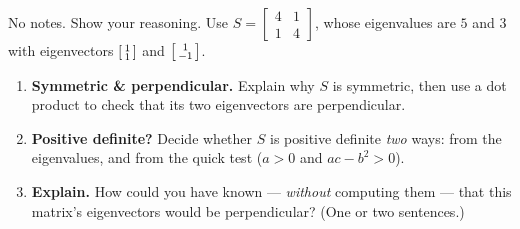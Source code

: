 \documentclass[10pt]{article}
\begin{document}
\namedateperiod

\vspace{0.15in}

No notes. Show your reasoning. Use $S=\begin{bmatrix} 4 & 1 \\ 1 & 4 \end{bmatrix}$, whose eigenvalues are
$5$ and $3$ with eigenvectors $\begin{bsmallmatrix}1\\1\end{bsmallmatrix}$ and $\begin{bsmallmatrix}1\\-1\end{bsmallmatrix}$.

\begin{enumerate}[leftmargin=1.8em, itemsep=14pt]
  \item \textbf{Symmetric \& perpendicular.} Explain why $S$ is symmetric, then use a dot product to check
        that its two eigenvectors are perpendicular.
        \vspace{1.6cm}
  \item \textbf{Positive definite?} Decide whether $S$ is positive definite \emph{two} ways: from the
        eigenvalues, and from the quick test ($a>0$ and $ac-b^2>0$).
        \vspace{1.6cm}
  \item \textbf{Explain.} How could you have known --- \emph{without} computing them --- that this matrix's
        eigenvectors would be perpendicular? (One or two sentences.)
\end{enumerate}
\end{document}
